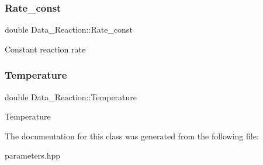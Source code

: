 \subsubsection{\texorpdfstring{Rate\+\_\+const}{Rate\_const}}
{\footnotesize\ttfamily double Data\+\_\+\+Reaction\+::\+Rate\+\_\+const}

Constant reaction rate \mbox{\label{classData__Reaction_a293b70ca46d6c090bca2d68de4669e3f}} 
\subsubsection{\texorpdfstring{Temperature}{Temperature}}
{\footnotesize\ttfamily double Data\+\_\+\+Reaction\+::\+Temperature}

Temperature 

The documentation for this class was generated from the following file\+:\begin{DoxyCompactItemize}
\item 
parameters.\+hpp\end{DoxyCompactItemize}
